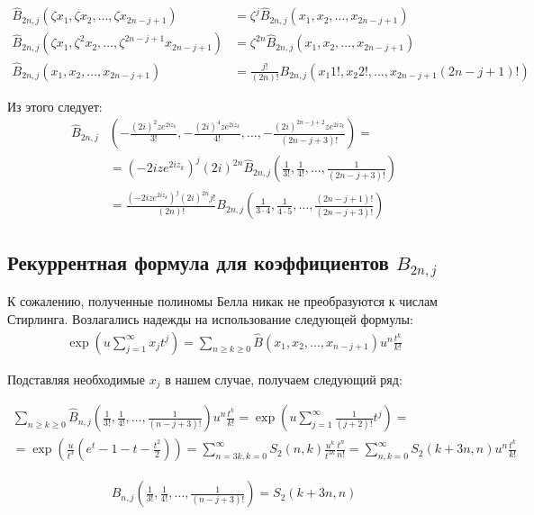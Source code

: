 \documentclass[a4paper, 12pt]{article}
\begin{document}
\begin{equation}
\begin{aligned}
    \hat{B}_{2n, j}(\zeta x_1, \zeta x_2, \dots, \zeta x_{2n-j+1}) &= \zeta^j \hat{B}_{2n, j}( x_1,  x_2, \dots,  x_{2n-j+1})\\
    \hat{B}_{2n, j}(\zeta x_1, \zeta^2 x_2, \dots, \zeta^{2n-j+1} x_{2n-j+1}) &= \zeta^{2n} \hat{B}_{2n, j}( x_1,  x_2, \dots,  x_{2n-j+1})\\
    \hat{B}_{2n, j}( x_1,  x_2, \dots,  x_{2n-j+1}) &= \frac{j!}{(2n)!}B_{2n, j}\left(x_1 1!, x_2 2!, \dots, x_{2n-j+1}(2n-j+1)!\right)
\end{aligned}
\end{equation}

Из этого следует:
\begin{equation}
\begin{aligned}
    \hat{B}_{2n, j}&\left(-\frac{(2i)^{2}ze^{2iz_k}}{3!}, -\frac{(2i)^{4}ze^{2iz_k}}{4!}, \dots, -\frac{(2i)^{2n-j+2}ze^{2iz_k}}{(2n-j+3)!}\right) = \\
    &= (-2iz e^{2iz_k})^j (2i)^{2n}\hat{B}_{2n, j}\left(\frac{1}{3!}, \frac{1}{4!}, \dots, \frac{1}{(2n-j+3)!}\right)\\
    &= \frac{(-2iz e^{2iz_k})^j (2i)^{2n}j!}{(2n)!}B_{2n, j}\left( \frac{1}{3\cdot 4}, \frac{1}{4\cdot 5} , \dots, \frac{(2n-j+1)!}{(2n-j+3)!}\right)
\end{aligned}
\end{equation}
\subsection*{Рекуррентная формула для коэффициентов $B_{2n, j}$}
К сожалению, полученные полиномы Белла никак не преобразуются к числам Стирлинга. Возлагались надежды на использование следующей формулы:
\begin{equation}
\begin{aligned}
    \exp\left(u \sum\limits_{j=1}^{\infty}x_j t^j\right) = \sum\limits_{n\geq k\geq 0} 
    \hat{B}\left(x_1, x_2, \dots, x_{n-j+1}\right) u^n \frac{t^k}{k!}
\end{aligned}
\end{equation}

Подставляя необходимые $x_j$ в нашем случае, получаем следующий ряд:

\begin{equation}
\begin{aligned}
    \sum\limits_{n\geq k\geq 0} 
    \hat{B}_{n, j}\left(\frac{1}{3!}, \frac{1}{4!}, \dots, \frac{1}{(n-j+3)!}\right) u^n \frac{t^k}{k!} = 
    \exp\left(u \sum\limits_{j=1}^{\infty}\frac{1}{(j+2)!} t^j\right) = \\
    = \exp\left(\frac{u}{t^3}\left(e^t - 1 -t - \frac{t^2}{2}\right)\right) = 
    \sum\limits_{n=3k, k = 0}^{\infty} S_{2}(n, k) \frac{u^k}{t^{3k}}\frac{t^n}{n!} = 
    \sum\limits_{n, k = 0}^{\infty} S_{2}(k+3n, n) u^n\frac{t^k}{k!}
\end{aligned}
\end{equation}


\begin{equation}
\begin{aligned}
    \hat{B}_{n, j}\left(\frac{1}{3!}, \frac{1}{4!}, \dots, \frac{1}{(n-j+3)!}\right) = S_{2}(k+3n, n)
\end{aligned}
\end{equation}
\end{document}
